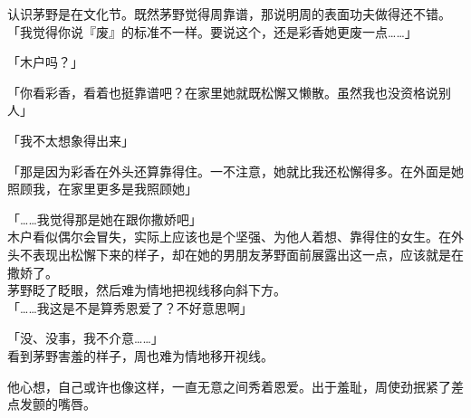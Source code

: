 认识茅野是在文化节。既然茅野觉得周靠谱，那说明周的表面功夫做得还不错。\\

「我觉得你说『废』的标准不一样。要说这个，还是彩香她更废一点……」

「木户吗？」

「你看彩香，看着也挺靠谱吧？在家里她就既松懈又懒散。虽然我也没资格说别人」

「我不太想象得出来」

「那是因为彩香在外头还算靠得住。一不注意，她就比我还松懈得多。在外面是她照顾我，在家里更多是我照顾她」

「……我觉得那是她在跟你撒娇吧」\\

木户看似偶尔会冒失，实际上应该也是个坚强、为他人着想、靠得住的女生。在外头不表现出松懈下来的样子，却在她的男朋友茅野面前展露出这一点，应该就是在撒娇了。\\

茅野眨了眨眼，然后难为情地把视线移向斜下方。\\

「……我这是不是算秀恩爱了？不好意思啊」

「没、没事，我不介意……」\\

看到茅野害羞的样子，周也难为情地移开视线。

他心想，自己或许也像这样，一直无意之间秀着恩爱。出于羞耻，周使劲抿紧了差点发颤的嘴唇。
